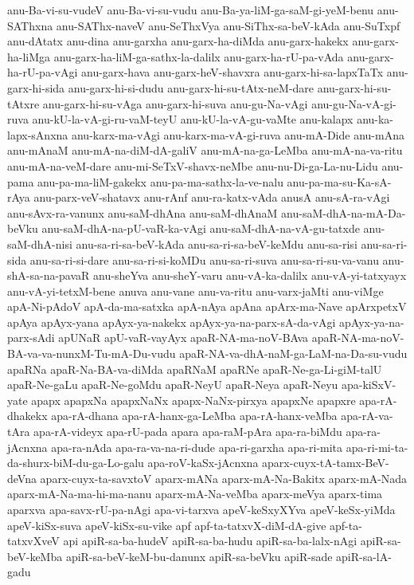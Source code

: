 {anu-Ba-vi-su-vudeV
anu-Ba-vi-su-vudu
anu-Ba-ya-liM-ga-saM-gi-yeM-benu
anu-SAThxna
anu-SAThx-naveV
anu-SeThxVya
anu-SiThx-sa-beV-kAda
anu-SuTxpf
anu-dAtatx
anu-dina
anu-garxha
anu-garx-ha-diMda
anu-garx-hakekx
anu-garx-ha-liMga
anu-garx-ha-liM-ga-sathx-la-dalilx
anu-garx-ha-rU-pa-vAda
anu-garx-ha-rU-pa-vAgi
anu-garx-hava
anu-garx-heV-shavxra
anu-garx-hi-sa-lapxTaTx
anu-garx-hi-sida
anu-garx-hi-si-dudu
anu-garx-hi-su-tAtx-neM-dare
anu-garx-hi-su-tAtxre
anu-garx-hi-su-vAga
anu-garx-hi-suva
anu-gu-Na-vAgi
anu-gu-Na-vA-gi-ruva
anu-kU-la-vA-gi-ru-vaM-teyU
anu-kU-la-vA-gu-vaMte
anu-kalapx
anu-ka-lapx-sAnxna
anu-karx-ma-vAgi
anu-karx-ma-vA-gi-ruva
anu-mA-Dide
anu-mAna
anu-mAnaM
anu-mA-na-diM-dA-galiV
anu-mA-na-ga-LeMba
anu-mA-na-va-ritu
anu-mA-na-veM-dare
anu-mi-SeTxV-shavx-neMbe
anu-nu-Di-ga-La-nu-Lidu
anu-pama
anu-pa-ma-liM-gakekx
anu-pa-ma-sathx-la-ve-nalu
anu-pa-ma-su-Ka-sA-rAya
anu-parx-veV-shatavx
anu-rAnf
anu-ra-katx-vAda
anusA
anu-sA-ra-vAgi
anu-sAvx-ra-vanunx
anu-saM-dhAna
anu-saM-dhAnaM
anu-saM-dhA-na-mA-Da-beVku
anu-saM-dhA-na-pU-vaR-ka-vAgi
anu-saM-dhA-na-vA-gu-tatxde
anu-saM-dhA-nisi
anu-sa-ri-sa-beV-kAda
anu-sa-ri-sa-beV-keMdu
anu-sa-risi
anu-sa-ri-sida
anu-sa-ri-si-dare
anu-sa-ri-si-koMDu
anu-sa-ri-suva
anu-sa-ri-su-va-vanu
anu-shA-sa-na-pavaR
anu-sheYva
anu-sheY-varu
anu-vA-ka-dalilx
anu-vA-yi-tatxyayx
anu-vA-yi-tetxM-bene
anuva
anu-vane
anu-va-ritu
anu-varx-jaMti
anu-viMge
apA-Ni-pAdoV
apA-da-ma-satxka
apA-nAya
apAna
apArx-ma-Nave
apArxpetxV
apAya
apAyx-yana
apAyx-ya-nakekx
apAyx-ya-na-parx-sA-da-vAgi
apAyx-ya-na-parx-sAdi
apUNaR
apU-vaR-vayAyx
apaR-NA-ma-noV-BAva
apaR-NA-ma-noV-BA-va-va-nunxM-Tu-mA-Du-vudu
apaR-NA-va-dhA-naM-ga-LaM-na-Da-su-vudu
apaRNa
apaR-Na-BA-va-diMda
apaRNaM
apaRNe
apaR-Ne-ga-Li-giM-talU
apaR-Ne-gaLu
apaR-Ne-goMdu
apaR-NeyU
apaR-Neya
apaR-Neyu
apa-kiSxV-yate
apapx
apapxNa
apapxNaNx
apapx-NaNx-pirxya
apapxNe
apapxre
apa-rA-dhakekx
apa-rA-dhana
apa-rA-hanx-ga-LeMba
apa-rA-hanx-veMba
apa-rA-va-tAra
apa-rA-videyx
apa-rU-pada
apara
apa-raM-pAra
apa-ra-biMdu
apa-ra-jAcnxna
apa-ra-nAda
apa-ra-va-na-ri-dude
apa-ri-garxha
apa-ri-mita
apa-ri-mi-ta-da-shurx-biM-du-ga-Lo-galu
apa-roV-kaSx-jAcnxna
aparx-cuyx-tA-tamx-BeV-deVna
aparx-cuyx-ta-savxtoV
aparx-mANa
aparx-mA-Na-Bakitx
aparx-mA-Nada
aparx-mA-Na-ma-hi-ma-nanu
aparx-mA-Na-veMba
aparx-meVya
aparx-tima
aparxva
apa-savx-rU-pa-nAgi
apa-vi-tarxva
apeV-keSxyXYva
apeV-keSx-yiMda
apeV-kiSx-suva
apeV-kiSx-su-vike
apf
apf-ta-tatxvX-diM-dA-give
apf-ta-tatxvXveV
api
apiR-sa-ba-hudeV
apiR-sa-ba-hudu
apiR-sa-ba-lalx-nAgi
apiR-sa-beV-keMba
apiR-sa-beV-keM-bu-danunx
apiR-sa-beVku
apiR-sade
apiR-sa-lA-gadu
}
